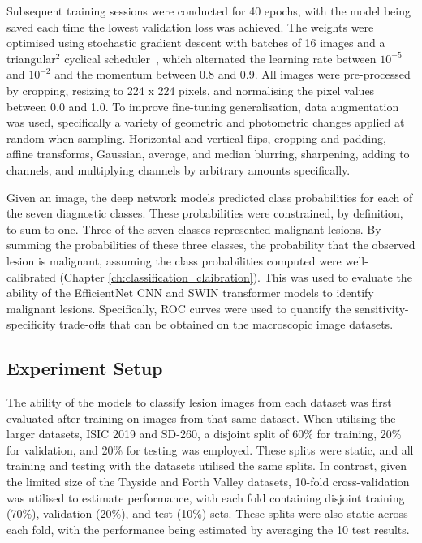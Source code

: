 Subsequent training sessions were conducted for 40 epochs, with the model being saved each time the lowest validation loss was achieved. The weights were optimised using stochastic gradient descent with batches of 16 images and a triangular$^2$ cyclical scheduler~\citep{smith2017cyclical}, which alternated the learning rate between $10^{-5}$ and $10^{-2}$ and the momentum between 0.8 and 0.9. All images were pre-processed by cropping, resizing to 224 x 224 pixels, and normalising the pixel values between 0.0 and 1.0. To improve fine-tuning generalisation, data augmentation was used, specifically a variety of geometric and photometric changes applied at random when sampling. Horizontal and vertical flips, cropping and padding, affine transforms, Gaussian, average, and median blurring, sharpening, adding to channels, and multiplying channels by arbitrary amounts specifically.

Given an image, the deep network models predicted class probabilities for each of the seven diagnostic classes. These probabilities were constrained, by definition, to sum to one. Three of the seven classes represented malignant lesions. By summing the probabilities of these three classes, the probability that the observed lesion is malignant, assuming the class probabilities computed were well-calibrated (Chapter \ref{ch:classification_claibration}). This was used to evaluate the ability of the EfficientNet CNN and SWIN transformer models to identify malignant lesions. Specifically, ROC curves were used to quantify the sensitivity-specificity trade-offs that can be obtained on the macroscopic image datasets. 

\subsection{Experiment Setup}
\label{subsec:generalisation_experiment}
The ability of the models to classify lesion images from each dataset was first evaluated after training on images from that same dataset. When utilising the larger datasets, ISIC 2019 and SD-260, a disjoint split of 60\% for training, 20\% for validation, and 20\% for testing was employed. These splits were static, and all training and testing with the datasets utilised the same splits. In contrast, given the limited size of the Tayside and Forth Valley datasets, 10-fold cross-validation was utilised to estimate performance, with each fold containing disjoint training (70\%), validation (20\%), and test (10\%) sets. These splits were also static across each fold, with the performance being estimated by averaging the 10 test results.

